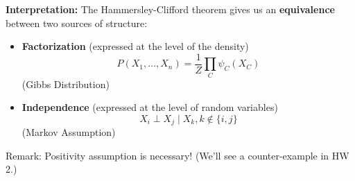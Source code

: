 \documentclass{article}%
\begin{document}
\textbf{Interpretation:} The Hammersley-Clifford theorem gives us an \textbf{equivalence} between two sources of structure:
\begin{itemize}
    \item \textbf{Factorization} (expressed at the level of the density)
    \[
    P(X_1, \dots, X_n) = \frac{1}{Z} \prod_C \psi_C (X_C)
    \]
    (Gibbs Distribution)
    \item \textbf{Independence} (expressed at the level of random variables)
    \[
    X_i \perp X_j \mid X_{k}, k \notin \{i,j\}
    \]
    (Markov Assumption)
\end{itemize}

Remark: Positivity assumption is necessary! (We'll see a counter-example in HW 2.)
\end{document}
